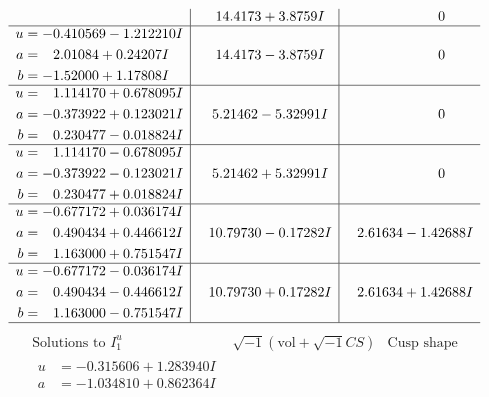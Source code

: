 \documentclass[1p]{elsarticle_modified}
\theoremstyle{definition}
\newcommand{\I}{\sqrt{-1}}
\begin{document}
$$\begin{array}{c|c|c}
 & \phantom{-}14.4173 + 3.8759 I & \phantom{-0.000000 } 0 \\ \hline\begin{aligned}
u &= -0.410569 - 1.212210 I \\
a &= \phantom{-}2.01084 + 0.24207 I \\
b &= -1.52000 + 1.17808 I\end{aligned}
 & \phantom{-}14.4173 - 3.8759 I & \phantom{-0.000000 } 0 \\ \hline\begin{aligned}
u &= \phantom{-}1.114170 + 0.678095 I \\
a &= -0.373922 + 0.123021 I \\
b &= \phantom{-}0.230477 - 0.018824 I\end{aligned}
 & \phantom{-}5.21462 - 5.32991 I & \phantom{-0.000000 } 0 \\ \hline\begin{aligned}
u &= \phantom{-}1.114170 - 0.678095 I \\
a &= -0.373922 - 0.123021 I \\
b &= \phantom{-}0.230477 + 0.018824 I\end{aligned}
 & \phantom{-}5.21462 + 5.32991 I & \phantom{-0.000000 } 0 \\ \hline\begin{aligned}
u &= -0.677172 + 0.036174 I \\
a &= \phantom{-}0.490434 + 0.446612 I \\
b &= \phantom{-}1.163000 + 0.751547 I\end{aligned}
 & \phantom{-}10.79730 - 0.17282 I & \phantom{-}2.61634 - 1.42688 I \\ \hline\begin{aligned}
u &= -0.677172 - 0.036174 I \\
a &= \phantom{-}0.490434 - 0.446612 I \\
b &= \phantom{-}1.163000 - 0.751547 I\end{aligned}
 & \phantom{-}10.79730 + 0.17282 I & \phantom{-}2.61634 + 1.42688 I\\
 \hline 
 \end{array}$$\newpage$$\begin{array}{c|c|c}  
\text{Solutions to }I^u_{1}& \I (\text{vol} + \sqrt{-1}CS) & \text{Cusp shape}\\
 \hline 
\begin{aligned}
u &= -0.315606 + 1.283940 I \\
a &= -1.034810 + 0.862364 I \\

\end{aligned}
\end{array}$$
\end{document}
